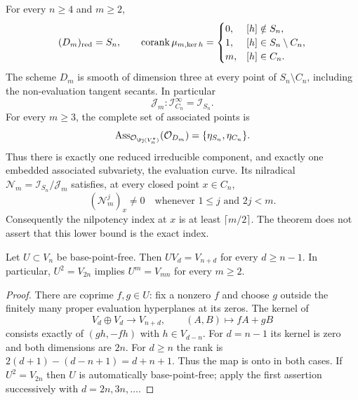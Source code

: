 \begin{theorem}
\label{thm:higher-hyperplane-global}
For every $n\ge4$ and $m\ge2$,
\begin{equation}\label{eq:hyperplane-complete-coranks}
 (D_m)_{\rm red}=S_n,\qquad
 \operatorname{corank}\mu_{m,\ker h}=
 \begin{cases}
 0,&[h]\notin S_n,\\
 1,&[h]\in S_n\setminus C_n,\\
 m,&[h]\in C_n.
 \end{cases}
\end{equation}
The scheme $D_m$ is smooth of dimension three at every point of
$S_n\setminus C_n$, including the non-evaluation tangent secants.
In particular
\begin{equation}\label{eq:hyperplane-saturation}
 \mathcal J_m:\mathcal I_{C_n}^{\infty}=\mathcal I_{S_n}.
\end{equation}
For every $m\ge3$, the complete set of associated points is
\begin{equation}\label{eq:hyperplane-associated-points}
 \operatorname{Ass}_{\mathcal O_{\Pj(V_n^*)}}
                  (\mathcal O_{D_m})=\{\eta_{S_n},\eta_{C_n}\}.
\end{equation}
Thus there is exactly one reduced irreducible component, and exactly
one embedded associated subvariety, the evaluation curve. Its
nilradical
$\mathcal N_m=\mathcal I_{S_n}/\mathcal J_m$ satisfies, at every
closed point $x\in C_n$,
\begin{equation}\label{eq:hyperplane-nilpotence-bound}
 (\mathcal N_m^j)_x\ne0\quad\text{whenever }1\le j\text{ and }2j<m.
\end{equation}
Consequently the nilpotency index at $x$ is at least
$\lceil m/2\rceil$. The theorem does not assert that this lower
bound is the exact index.
\end{theorem}

\begin{lemma}
\label{lem:hyperplane-propagation}
Let $U\subset V_n$ be base-point-free. Then
$UV_d=V_{n+d}$ for every $d\ge n-1$. In particular,
$U^2=V_{2n}$ implies $U^m=V_{mn}$ for every $m\ge2$.
\end{lemma}
\begin{proof}
There are coprime $f,g\in U$: fix a nonzero $f$ and choose $g$
outside the finitely many proper evaluation hyperplanes at its
zeros. The kernel of
\[
 V_d\oplus V_d\longrightarrow V_{n+d},\qquad
                  (A,B)\longmapsto fA+gB
\]
consists exactly of $(gh,-fh)$ with $h\in V_{d-n}$.
For $d=n-1$ its kernel is zero and both dimensions are $2n$.
For $d\ge n$ the rank is
$2(d+1)-(d-n+1)=d+n+1$. Thus the map is onto in both cases.
If $U^2=V_{2n}$ then $U$ is automatically base-point-free;
apply the first assertion successively with $d=2n,3n,\ldots$.
\end{proof}

